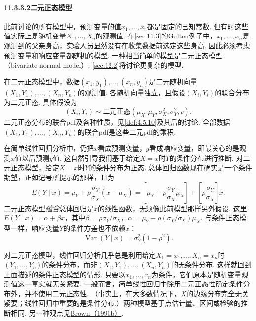 \paragraph{11.3.3.2\quad 二元正态模型}\label{sec:11.3.3.2}
此前讨论的所有模型中，预测变量的值$x_1,\ldots,x_n$都是固定的已知常数. 但有时这些值实际上是随机变量$X_1,\ldots,X_n$的观测值. 在\autoref{sec:11.3}的Galton例子中，$x_1,\ldots,x_n$是观测到的父亲身高，实验人员显然没有在收集数据前选定这些身高. 因此必须考虑预测变量和响应变量都随机的模型. 一种相当简单的模型是二元正态模型（bivariate normal model）. \autoref{sec:12.2}将讨论更复杂的模型.

在二元正态模型中，数据$(x_1,y_1),\allowbreak\ldots,\allowbreak(x_n,y_n)$是二元随机向量$(X_1,Y_1),\allowbreak\ldots,\allowbreak(X_n,Y_n)$的观测值. 各随机向量独立，且假设$(X_i,Y_i)$的联合分布为二元正态. 具体假设为
$$ (X_i,Y_i)\sim\text{二元正态}(\mu_X,\mu_Y,\sigma_X^2,\sigma_Y^2,\rho). $$
二元正态分布的联合pdf及各种性质，见\autoref{def:4.5.10}及其后的讨论. 全部数据$(X_1,Y_1),\allowbreak\ldots,\allowbreak(X_n,Y_n)$的联合pdf是这些二元pdf的乘积.

在简单线性回归分析中，仍把$x$看成预测变量，$y$看成响应变量，即最关心的是观测$x$值以后预测$y$值.
这自然引导我们基于给定$X=x$时$Y$的条件分布进行推断. 对二元正态模型，给定$X=x$时$Y$的条件分布为正态. 总体回归函数现在确实是一个条件期望，正如记号所提示的那样，且为
\begin{equation}\label{eq:11.3.25}
E(Y\mid x)=\mu_Y+\rho\frac{\sigma_Y}{\sigma_X}(x-\mu_X)
=\left[\mu_Y-\rho\frac{\sigma_Y}{\sigma_X}\mu_X\right]
+\left[\rho\frac{\sigma_Y}{\sigma_X}\right]x.
\end{equation}
二元正态模型\emph{蕴含}总体回归是$x$的线性函数，无须像此前模型那样另外假设. 这里$E(Y\mid x)=\alpha+\beta x$，其中$\beta=\rho\sigma_Y/\sigma_X$，$\alpha=\mu_Y-\rho(\sigma_Y/\sigma_X)\mu_X$. 与条件正态模型一样，响应变量$Y$的条件方差也不依赖$x$：
\begin{equation}\label{eq:11.3.26}
\operatorname{Var}(Y\mid x)=\sigma_Y^2(1-\rho^2).
\end{equation}

对二元正态模型，线性回归分析几乎总是利用给定$X_1=x_1,\ldots,X_n=x_n$时$(Y_1,\ldots,Y_n)$的条件分布，而非$(X_1,Y_1),\allowbreak\ldots,\allowbreak(X_n,Y_n)$的无条件分布. 这样就回到上面描述的条件正态模型的情形. 只要以$x_1,\ldots,x_n$为条件，它们原本是随机变量观测值这一事实就无关紧要. 一般而言，简单线性回归中除用二元正态性确定条件分布外，并不使用二元正态性. （事实上，在大多数情况下，$X$的边缘分布完全无关紧要；线性回归中重要的是条件分布.）两种模型基于点估计量、区间或检验的推断相同. 另一种观点见\hyperref[bib:source52]{Brown（1990b）}.

